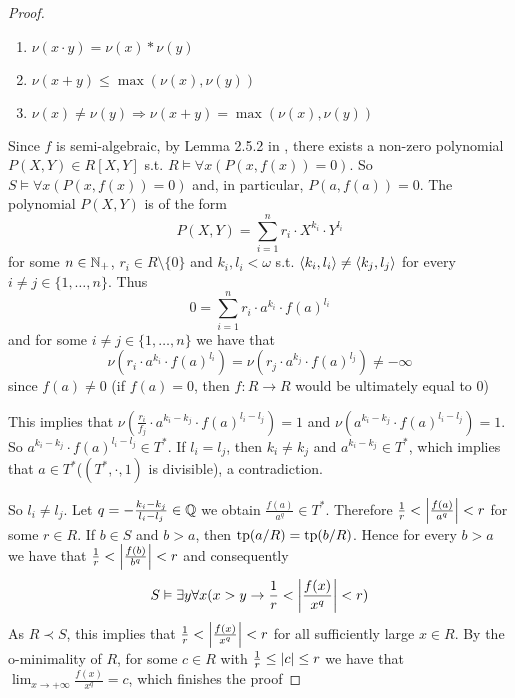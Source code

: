 \documentclass[11pt]{article}
\begin{document}
\begin{proof}
\begin{enumerate}
\setcounter{enumi}{0}
\item \(\nu(x\cdot y)=\nu(x)*\nu(y)\)
\item \(\nu(x+y)\le\max(\nu(x),\nu(y))\)
\item \(\nu(x)\neq\nu(y)\Rightarrow\nu(x+y)=\max(\nu(x),\nu(y))\)
\end{enumerate}
Since \(f\) is semi-algebraic, by Lemma 2.5.2 in \cite{bochnak2013real}, there exists a
non-zero polynomial \(P(X,Y)\in R[X,Y]\) s.t. \(R\vDash\forall x(P(x,f(x))=0)\). So \(S\vDash\forall x(P(x,f(x))=0)\)
and, in particular, \(P(a,f(a))=0\). The polynomial \(P(X,Y)\) is of the form
\begin{equation*}
P(X,Y)=\sum_{i=1}^nr_i\cdot X^{k_i}\cdot Y^{l_i}
\end{equation*}
for some \(n\in\mathbb{N}_+\), \(r_i\in R\setminus\{0\}\) and \(k_i,l_i<\omega\) s.t. \(\langle k_i,l_i\rangle\neq\langle k_j,l_j\rangle\) for
every \(i\neq j\in\{1,\dots,n\}\). Thus
\begin{equation*}
0=\sum_{i=1}^nr_i\cdot a^{k_i}\cdot f(a)^{l_i}
\end{equation*}
and for some \(i\neq j\in\{1,\dots,n\}\) we have that
\begin{equation*}
\nu(r_i\cdot a^{k_i}\cdot f(a)^{l_i})=\nu(r_j\cdot a^{k_j}\cdot f(a)^{l_j})\neq-\infty
\end{equation*}
since \(f(a)\neq 0\) (if \(f(a)=0\), then \(f:R\to R\) would be ultimately equal to 0)

This implies that \(\nu(\frac{r_i}{f_j}\cdot a^{k_i-k_j}\cdot f(a)^{l_i-l_j})=1\)
and \(\nu(a^{k_i-k_j}\cdot f(a)^{l_i-l_j})=1\). So \(a^{k_i-k_j}\cdot f(a)^{l_i-l_j}\in T^*\). If \(l_i=l_j\),
then \(k_i\neq k_j\) and \(a^{k_i-k_j}\in T^*\), which implies that \(a\in T^*\)(\((T^*,\cdot,1)\) is
divisible), a contradiction.

So \(l_i\neq l_j\). Let \(q=-\frac{k_i-k_j}{l_i-l_j}\in\mathbb{Q}\) we obtain \(\frac{f(a)}{a^q}\in T^*\).
Therefore \(\frac{1}{r}<\abs{\frac{f(a)}{a^q}}<r\) for some \(r\in R\). If \(b\in S\) and \(b>a\),
then \(\operatorname{tp}(a/R)=\operatorname{tp}(b/R)\). Hence for every \(b>a\) we have
that \(\frac{1}{r}<\abs{\frac{f(b)}{b^q}}<r\) and consequently
\begin{equation*}
S\vDash\exists y\forall x(x>y\to\frac{1}{r}<\abs{\frac{f(x)}{x^q}}<r)
\end{equation*}
As \(R\prec S\), this implies that \(\frac{1}{r}<\abs{\frac{f(x)}{x^q}}<r\) for all sufficiently
large \(x\in R\). By the o-minimality of \(R\), for some \(c\in R\) with \(\frac{1}{r}\le\abs{c}\le r\)
we have that \(\lim_{x\to+\infty}\frac{f(x)}{x^q}=c\), which finishes the proof
\end{proof}
\end{document}
